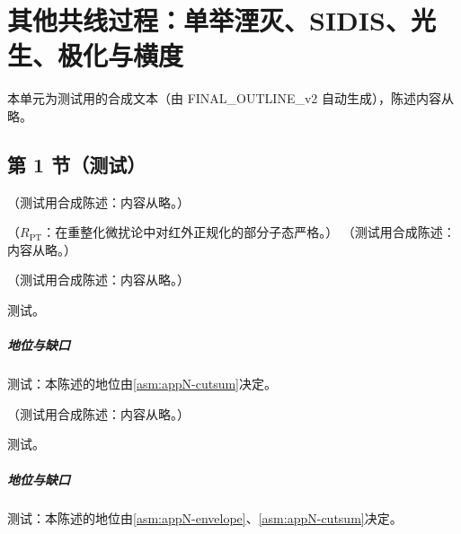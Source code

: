 \chapter{其他共线过程：单举湮灭、SIDIS、光生、极化与横度}\label{ch:coll}
本单元为测试用的合成文本（由 FINAL\_OUTLINE\_v2 自动生成），陈述内容从略。

\section{第 1 节（测试）}\label{sec:coll-sia}

\begin{definition}[单举湮灭的运动学]\label{def:coll-sia}
（测试用合成陈述：内容从略。）
\end{definition}

\begin{lemma}\label{lem:coll-final-poles}
（$R_{\mathrm{PT}}$：在重整化微扰论中对红外正规化的部分子态严格。）
（测试用合成陈述：内容从略。）
\end{lemma}

\begin{lemma}\label{lem:coll-unobserved-jet}
（测试用合成陈述：内容从略。）
\end{lemma}
\begin{proofsketch}测试。\end{proofsketch}
\paragraph{地位与缺口}测试：本陈述的地位由\cref{asm:appN-cutsum}决定。

\begin{proposition}\label{prop:coll-sia-regions}
（测试用合成陈述：内容从略。）
\end{proposition}
\begin{proofsketch}测试。\end{proofsketch}
\paragraph{地位与缺口}测试：本陈述的地位由\cref{asm:appN-envelope}、\cref{asm:appN-cutsum}决定。

